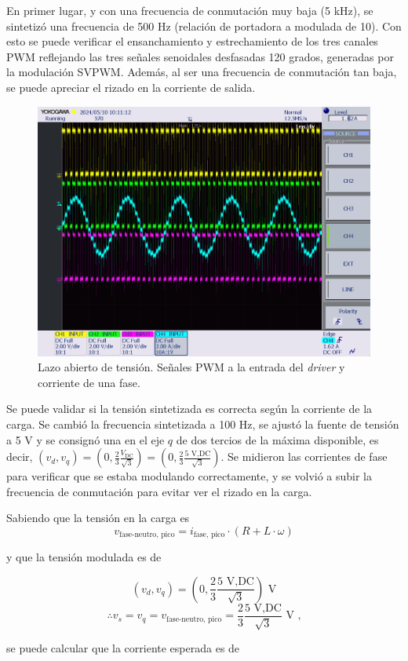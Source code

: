 En primer lugar, y con una frecuencia de conmutación muy baja (5 kHz), se sintetizó una frecuencia de 500 Hz (relación de portadora a modulada de 10). Con esto se puede verificar el ensanchamiento y estrechamiento de los tres canales PWM reflejando las tres señales senoidales desfasadas 120 grados, generadas por la modulación SVPWM. Además, al ser una frecuencia de conmutación tan baja, se puede apreciar el rizado en la corriente de salida.

\begin{figure}[H]
	\centering
	\includegraphics[width=0.7\linewidth]{fig/3RL-PWM}
	\caption{Lazo abierto de tensión. Señales PWM a la entrada del \textit{driver} y corriente de una fase.}
\end{figure}

Se puede validar si la tensión sintetizada es correcta según la corriente de la carga. Se cambió la frecuencia sintetizada a 100 Hz, se ajustó la fuente de tensión a 5 V y se consignó una en el eje $q$ de dos tercios de la máxima disponible, es decir, $(v_d, v_q) = (0, \frac{2}{3}\frac{V_{\text{DC}}}{\sqrt{3}}) = (0, \frac{2}{3}\frac{5 \text{ V,DC}}{\sqrt{3}})$. Se midieron las corrientes de fase para verificar que se estaba modulando correctamente, y se volvió a subir la frecuencia de conmutación para evitar ver el rizado en la carga.

Sabiendo que la tensión en la carga es
\[
v_{\text{fase-neutro, pico}} = i_{\text{fase, pico}}\cdot (R + L\cdot\omega)
\]

y que la tensión modulada es de 

\[ (v_d, v_q) = (0, \frac{2}{3}\frac{5 \text{ V,DC}}{\sqrt{3}}) \text{ V}\]
\[ \therefore v_s = v_q = v_{\text{fase-neutro, pico}} = \frac{2}{3}\frac{5 \text{ V,DC}}{\sqrt{3}} \text{ V ,}\]

se puede calcular que la corriente esperada es de

